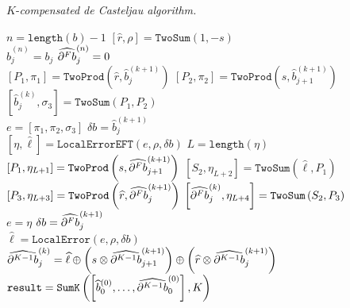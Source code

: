 \begin{breakablealgorithm}
  \caption{\(K\)-\textit{compensated de Casteljau algorithm.}}
  \label{alg:k-comp-de-casteljau}

  \begin{algorithmic}
      \State \(n = \texttt{length}(b) - 1\)
      \State \(\left[\widehat{r}, \rho\right] = \mathtt{TwoSum}(1, -s)\)
      \\
        \State \(\widehat{b}_j^{(n)} = b_j\)
          \State \(\cdb{F}_j^{(n)} = 0\)
        \EndFor
      \EndFor
      \\
          \State \(\left[P_1, \pi_1\right] = \mathtt{TwoProd}\left(
              \widehat{r}, \widehat{b}_j^{(k + 1)}\right)\)
          \State \(\left[P_2, \pi_2\right] = \mathtt{TwoProd}\left(
              s, \widehat{b}_{j + 1}^{(k + 1)}\right)\)
          \State \(\left[\widehat{b}_j^{(k)}, \sigma_3\right] =
              \mathtt{TwoSum}(P_1, P_2)\)
          \\
          \State \(e = \left[\pi_1, \pi_2, \sigma_3\right]\)
          \State \(\delta b = \widehat{b}_j^{(k + 1)}\)
          \\
            \State \(\left[\eta, \widehat{\ell}\right] =
                \mathtt{LocalErrorEFT}(e, \rho, \delta b)\)
            \State \(L = \texttt{length}(\eta)\)
            \\
            \State \(\left[P_1, \eta_{L + 1}\right] = \mathtt{TwoProd}\left(
                s, \cdb{F}_{j + 1}^{(k + 1)}\right)\)
            \State \(\left[S_2, \eta_{L + 2}\right] =
                \mathtt{TwoSum}\left(\widehat{\ell}, P_1\right)\)
            \State \(\left[P_3, \eta_{L + 3}\right] = \mathtt{TwoProd}\left(
                \widehat{r}, \cdb{F}_j^{(k + 1)}\right)\)
            \State \(\left[\cdb{F}_j^{(k)}, \eta_{L + 4}\right]
                = \mathtt{TwoSum}\left(S_2, P_3\right)\)
            \\
            \State \(e = \eta\)
            \State \(\delta b = \cdb{F}_j^{(k + 1)}\)
          \EndFor
          \\
          \State \(\widehat{\ell} =
                \mathtt{LocalError}(e, \rho, \delta b)\)
          \State \(\cdb{K - 1}_j^{(k)} =
              \widehat{\ell} \oplus
              \left(s \otimes \cdb{K - 1}_{j + 1}^{(k + 1)}
              \right) \oplus
              \left(\widehat{r} \otimes
              \cdb{K - 1}_j^{(k + 1)}\right)\)
        \EndFor
      \EndFor
      \\
      \State \(\mathtt{result} = \mathtt{SumK}\left(\left[
        \widehat{b}_0^{(0)}, \ldots, \cdb{K - 1}_0^{(0)}\right], K\right)\)
    \EndFunction
  \end{algorithmic}
\end{breakablealgorithm}

